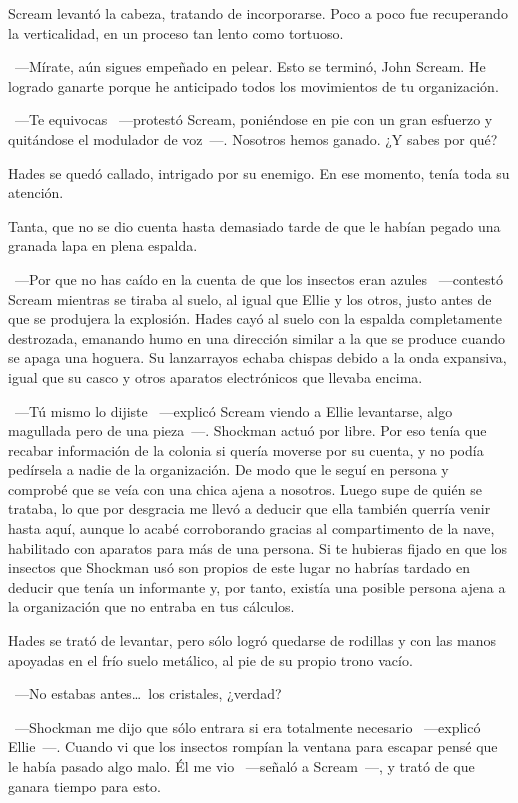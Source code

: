 Scream levantó la cabeza, tratando de incorporarse. Poco a poco fue recuperando la verticalidad, en un proceso tan lento como tortuoso.

~---Mírate, aún sigues empeñado en pelear. Esto se terminó, John Scream. He logrado ganarte porque he anticipado todos los movimientos de tu organización.

~---Te equivocas ~---protestó Scream, poniéndose en pie con un gran esfuerzo y quitándose el modulador de voz~---. Nosotros hemos ganado. ¿Y sabes por qué?

Hades se quedó callado, intrigado por su enemigo. En ese momento, tenía toda su atención.

Tanta, que no se dio cuenta hasta demasiado tarde de que le habían pegado una granada lapa en plena espalda.

~---Por que no has caído en la cuenta de que los insectos eran azules ~---contestó Scream mientras se tiraba al suelo, al igual que Ellie y los otros, justo antes de que se produjera la explosión. Hades cayó al suelo con la espalda completamente destrozada, emanando humo en una dirección similar a la que se produce cuando se apaga una hoguera. Su lanzarrayos echaba chispas debido a la onda expansiva, igual que su casco y otros aparatos electrónicos que llevaba encima.

~---Tú mismo lo dijiste ~---explicó Scream viendo a Ellie levantarse, algo magullada pero de una pieza~---. Shockman actuó por libre. Por eso tenía que recabar información de la colonia si quería moverse por su cuenta, y no podía pedírsela a nadie de la organización. De modo que le seguí en persona y comprobé que se veía con una chica ajena a nosotros. Luego supe de quién se trataba, lo que por desgracia me llevó a deducir que ella también querría venir hasta aquí, aunque lo acabé corroborando gracias al compartimento de la nave, habilitado con aparatos para más de una persona. Si te hubieras fijado en que los insectos que Shockman usó son propios de este lugar no habrías tardado en deducir que tenía un informante y, por tanto, existía una posible persona ajena a la organización que no entraba en tus cálculos.

Hades se trató de levantar, pero sólo logró quedarse de rodillas y con las manos apoyadas en el frío suelo metálico, al pie de su propio trono vacío.

~---No estabas antes\dots\ los cristales, ¿verdad?

~---Shockman me dijo que sólo entrara si era totalmente necesario ~---explicó Ellie~---. Cuando vi que los insectos rompían la ventana para escapar pensé que le había pasado algo malo. Él me vio ~---señaló a Scream~---, y trató de que ganara tiempo para esto.

